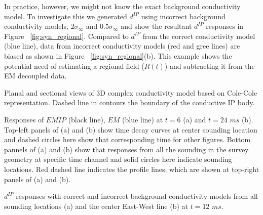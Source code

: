 \documentclass{segabs}
\begin{document}
In practice, however, we might not know the exact background conductivity model. To investigate this we  generated $d^{IP}$ using incorrect background conductivity models, $2\sigma_{\infty}$ and $0.5\sigma_{\infty}$ and show the resultant $d^{IP}$ responses in Figure ~\ref{fig:syn_regional}. Compared to $d^{IP}$ from the correct conductivity model (blue line), data from incorrect conductivity models (red and gree lines) are biased as shown in Figure ~\ref{fig:syn_regional}(b). This example shows the potential need of estimating a regional  field ($R(t)$) and subtracting it from the EM decoupled data.

{Planal and sectional views of 3D complex conductivity model based on Cole-Cole representation. Dashed line in contours the boundary of the conductive IP body.}

{Responses of $EMIP$ (black line), $EM$ (blue line) at $t=6$ (a) and $t=24$ $ms$ (b). Top-left panels of (a) and (b) show time decay curves at center sounding location and dashed circles here show that corresponding time for other figures. Bottom pannels of (a) and (b) show that responses from all the sounding in the survey geometry at specific time channel and solid circles here indicate sounding locations. Red dashed line indicates the profile lines, which are shown at top-right panels of (a) and (b).}

{$d^{IP}$ responses with correct and incorrect background conductivity models from all sounding locations (a) and the center East-West line (b) at $t = 12$ $ms$. }
\end{document}
